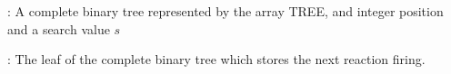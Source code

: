 \begin{algorithm}[H]
\DontPrintSemicolon
{}

\caption{\protect{}}
\label{algo:search-tree}

\Input: A complete binary tree represented by the array TREE, and integer position and a search value $s$\;

\Output: The leaf of the complete binary tree which stores the next reaction firing.\;



\end{algorithm}
